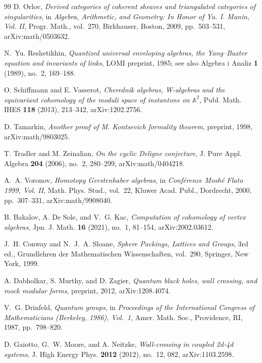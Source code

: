\begin{thebibliography}{99}
D. Orlov, \emph{Derived categories of coherent sheaves and triangulated categories of singularities}, in \emph{Algebra, Arithmetic, and Geometry: In Honor of Yu. I. Manin, Vol. II}, Progr. Math., vol.~270, Birkhauser, Boston, 2009, pp.~503--531, arXiv:math/0503632.

N.~Yu. Reshetikhin, \emph{Quantized universal enveloping algebras, the Yang--Baxter equation and invariants of links}, LOMI preprint, 1985; see also Algebra i Analiz \textbf{1} (1989), no.~2, 169--188.

O. Schiffmann and E. Vasserot, \emph{Cherednik algebras, W-algebras and the equivariant cohomology of the moduli space of instantons on $\mathbb{A}^2$}, Publ. Math. IHES \textbf{118} (2013), 213--342, arXiv:1202.2756.

D. Tamarkin, \emph{Another proof of M. Kontsevich formality theorem}, preprint, 1998, arXiv:math/9803025.

T. Tradler and M. Zeinalian, \emph{On the cyclic Deligne conjecture}, J. Pure Appl. Algebra \textbf{204} (2006), no.~2, 280--299, arXiv:math/0404218.

A.~A. Voronov, \emph{Homotopy Gerstenhaber algebras}, in \emph{Conf\'erence Mosh\'e Flato 1999, Vol. II}, Math. Phys. Stud., vol.~22, Kluwer Acad. Publ., Dordrecht, 2000, pp.~307--331, arXiv:math/9908040.


B. Bakalov, A. De Sole, and V.~G. Kac, \emph{Computation of cohomology of vertex algebras}, Jpn. J. Math. \textbf{16} (2021), no.~1, 81--154, arXiv:2002.03612.

J.~H. Conway and N.~J.~A. Sloane, \emph{Sphere Packings, Lattices and Groups}, 3rd ed., Grundlehren der Mathematischen Wissenschaften, vol.~290, Springer, New York, 1999.

A. Dabholkar, S. Murthy, and D. Zagier, \emph{Quantum black holes, wall crossing, and mock modular forms}, preprint, 2012, arXiv:1208.4074.

V.~G. Drinfeld, \emph{Quantum groups}, in \emph{Proceedings of the International Congress of Mathematicians (Berkeley, 1986), Vol.~1}, Amer. Math. Soc., Providence, RI, 1987, pp.~798--820.

D. Gaiotto, G.~W. Moore, and A. Neitzke, \emph{Wall-crossing in coupled 2d-4d systems}, J. High Energy Phys. \textbf{2012} (2012), no.~12, 082, arXiv:1103.2598.


\end{thebibliography}
